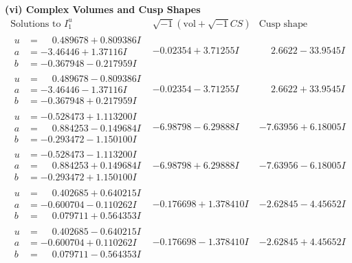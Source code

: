 \documentclass[1p]{elsarticle_modified}
\theoremstyle{definition}
\newcommand{\I}{\sqrt{-1}}
\begin{document}
\newpage\flushleft \textbf{(vi) Complex Volumes and Cusp Shapes}
$$\begin{array}{c|c|c}  
\text{Solutions to }I^u_{1}& \I (\text{vol} + \sqrt{-1}CS) & \text{Cusp shape}\\
 \hline 
\begin{aligned}
u &= \phantom{-}0.489678 + 0.809386 I \\
a &= -3.46446 + 1.37116 I \\
b &= -0.367948 - 0.217959 I\end{aligned}
 & -0.02354 + 3.71255 I & \phantom{-}2.6622 - 33.9545 I \\ \hline\begin{aligned}
u &= \phantom{-}0.489678 - 0.809386 I \\
a &= -3.46446 - 1.37116 I \\
b &= -0.367948 + 0.217959 I\end{aligned}
 & -0.02354 - 3.71255 I & \phantom{-}2.6622 + 33.9545 I \\ \hline\begin{aligned}
u &= -0.528473 + 1.113200 I \\
a &= \phantom{-}0.884253 - 0.149684 I \\
b &= -0.293472 - 1.150100 I\end{aligned}
 & -6.98798 - 6.29888 I & -7.63956 + 6.18005 I \\ \hline\begin{aligned}
u &= -0.528473 - 1.113200 I \\
a &= \phantom{-}0.884253 + 0.149684 I \\
b &= -0.293472 + 1.150100 I\end{aligned}
 & -6.98798 + 6.29888 I & -7.63956 - 6.18005 I \\ \hline\begin{aligned}
u &= \phantom{-}0.402685 + 0.640215 I \\
a &= -0.600704 - 0.110262 I \\
b &= \phantom{-}0.079711 + 0.564353 I\end{aligned}
 & -0.176698 + 1.378410 I & -2.62845 - 4.45652 I \\ \hline\begin{aligned}
u &= \phantom{-}0.402685 - 0.640215 I \\
a &= -0.600704 + 0.110262 I \\
b &= \phantom{-}0.079711 - 0.564353 I\end{aligned}
 & -0.176698 - 1.378410 I & -2.62845 + 4.45652 I \\ \hline\begin{aligned}

\end{aligned}
\end{array}$$
\end{document}
